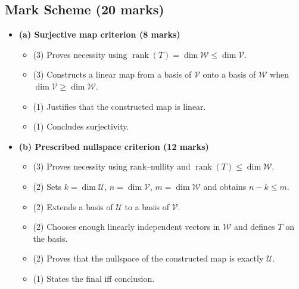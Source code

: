 \documentclass[12pt]{article}
\newcommand{\V}{\mathcal{V}}
\newcommand{\W}{\mathcal{W}}
\newcommand{\U}{\mathcal{U}}
\newcommand{\rank}{\operatorname{rank}}
\begin{document}
\subsection{Mark Scheme (20 marks)}
\begin{itemize}[leftmargin=1.6em]
  \item \textbf{(a) Surjective map criterion (8 marks)}
  \begin{itemize}[leftmargin=1.6em]
    \item (3) Proves necessity using $\rank(T)=\dim\W\le\dim\V$.
    \item (3) Constructs a linear map from a basis of $\V$ onto a basis of $\W$ when $\dim\V\ge\dim\W$.
    \item (1) Justifies that the constructed map is linear.
    \item (1) Concludes surjectivity.
  \end{itemize}
  \item \textbf{(b) Prescribed nullspace criterion (12 marks)}
  \begin{itemize}[leftmargin=1.6em]
    \item (3) Proves necessity using rank--nullity and $\rank(T)\le\dim\W$.
    \item (2) Sets $k=\dim\U$, $n=\dim\V$, $m=\dim\W$ and obtains $n-k\le m$.
    \item (2) Extends a basis of $\U$ to a basis of $\V$.
    \item (2) Chooses enough linearly independent vectors in $\W$ and defines $T$ on the basis.
    \item (2) Proves that the nullspace of the constructed map is exactly $\U$.
    \item (1) States the final iff conclusion.
  \end{itemize}
\end{itemize}
\end{document}
